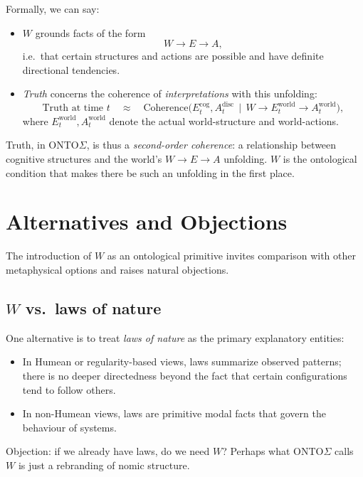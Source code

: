 \documentclass[12pt,a4paper]{report}
\newcommand{\Will}{W}
\begin{document}
Formally, we can say:

\begin{itemize}[leftmargin=2em]
    \item \(\Will\) grounds facts of the form
    \[
        W \to E \to A,
    \]
    i.e.\ that certain structures and actions are possible and have definite directional tendencies.
    \item \emph{Truth} concerns the coherence of \emph{interpretations} with this unfolding:
    \[
        \text{Truth at time } t \quad \approx \quad \mathrm{Coherence}\bigl(
            E_t^{\mathrm{cog}}, A_t^{\mathrm{disc}} \,\mid\, W \to E_t^{\mathrm{world}} \to A_t^{\mathrm{world}}
        \bigr),
    \]
    where \(E_t^{\mathrm{world}}, A_t^{\mathrm{world}}\) denote the actual world-structure and world-actions.
\end{itemize}

Truth, in ONTO$\Sigma$, is thus a \emph{second-order coherence}: a relationship between cognitive structures and the world’s $W \to E \to A$ unfolding. \(\Will\) is the ontological condition that makes there be such an unfolding in the first place.

\section{Alternatives and Objections}

The introduction of \(\Will\) as an ontological primitive invites comparison with other metaphysical options and raises natural objections.

\subsection*{\texorpdfstring{$W$}{W} vs.\ laws of nature}

One alternative is to treat \emph{laws of nature} as the primary explanatory entities:

\begin{itemize}[leftmargin=2em]
    \item In Humean or regularity-based views, laws summarize observed patterns; there is no deeper directedness beyond the fact that certain configurations tend to follow others.
    \item In non-Humean views, laws are primitive modal facts that govern the behaviour of systems.
\end{itemize}

Objection: if we already have laws, do we need \(\Will\)? Perhaps what ONTO$\Sigma$ calls \(\Will\) is just a rebranding of nomic structure.
\end{document}
